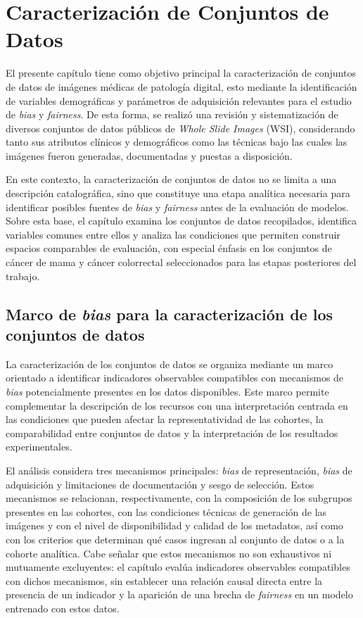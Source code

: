 \chapter{Caracterización de Conjuntos de Datos}
\label{cap:caracterizacion_datasets}

El presente capítulo tiene como objetivo principal
la caracterización de conjuntos de datos de imágenes médicas de patología digital, esto mediante la 
identificación de variables demográficas y parámetros de adquisición relevantes para el estudio de \textit{bias} 
y \textit{fairness}. 
De esta forma, se realizó una revisión y sistematización de diversos conjuntos de datos públicos de 
\textit{Whole Slide Images}
(WSI), considerando tanto sus atributos clínicos y demográficos como las técnicas bajo las cuales
las imágenes fueron generadas, documentadas y puestas a disposición.

En este contexto, la caracterización de conjuntos de datos no se limita a una descripción catalográfica, sino que 
constituye una etapa analítica necesaria para identificar posibles fuentes de \textit{bias} y \textit{fairness} antes de la evaluación 
de modelos. Sobre esta base, el capítulo examina los conjuntos de datos recopilados, identifica variables comunes 
entre ellos y analiza las condiciones que permiten construir espacios comparables de evaluación, con especial
énfasis en los conjuntos de cáncer de mama y cáncer colorrectal seleccionados para las etapas posteriores 
del trabajo.

\section{Marco de \textit{bias} para la caracterización de los conjuntos de datos}
\label{sec:marco_bias}

La caracterización de los conjuntos de datos se organiza mediante un marco orientado a identificar indicadores observables compatibles con mecanismos de \textit{bias} potencialmente presentes en los datos disponibles. Este marco permite complementar la descripción de los recursos con una interpretación centrada en las condiciones que pueden afectar la representatividad de las cohortes, la comparabilidad entre conjuntos de datos y la interpretación de los resultados experimentales.

El análisis considera tres mecanismos principales: \textit{bias} de representación, \textit{bias} de adquisición y limitaciones de documentación y sesgo de selección. Estos mecanismos se relacionan, respectivamente, con la composición de los subgrupos presentes en las cohortes, con las condiciones técnicas de generación de las imágenes y con el nivel de disponibilidad y calidad de los metadatos, así como con los criterios que determinan qué casos ingresan al conjunto de datos o a la cohorte analítica. Cabe señalar que estos mecanismos no son exhaustivos ni mutuamente excluyentes: el capítulo evalúa indicadores observables compatibles con dichos mecanismos, sin establecer una relación causal directa entre la presencia de un indicador y la aparición de una brecha de \textit{fairness} en un modelo entrenado con estos datos.

